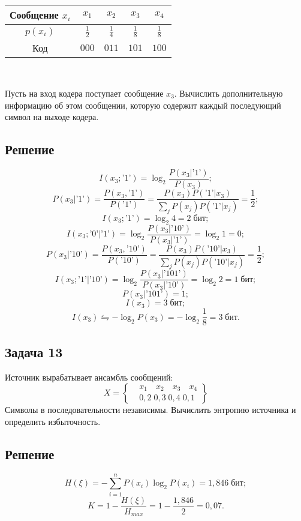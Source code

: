 \documentclass[oneside, final, 12pt]{extarticle}
\begin{document}
~

\begin{tabular}{|c|c|c|c|c|} \hline
	Сообщение \(x_i\) & \(x_1\) & \(x_2\) & \(x_3\) & \(x_4\) \\ \hline
	\(p(x_i)\) & \(\frac{1}{2}\) & \(\frac{1}{4}\) & \(\frac{1}{8}\) & \(\frac{1}{8}\) \\ \hline
	Код & \(000\) & \(011\) & \(101\) & \(100\) \\ \hline
\end{tabular}

~

Пусть на вход кодера поступает сообщение \(x_3\). Вычислить дополнительную информацию об этом сообщении, которую содержит каждый последующий символ на выходе кодера.

\subsection*{Решение}
\[I(x_3;\text{'}1\text{'})=\log_2\frac{P(x_3|\text{'}1\text{'})}{P(x_3)};\]
\[P(x_3|\text{'}1\text{'})=\frac{P(x_3,\text{'}1\text{'})}{P(\text{'}1\text{'})}=\frac{P(x_3)P(\text{'}1\text{'}|x_3)}{\sum_{j} P(x_j)P(\text{'}1\text{'}|x_j)}=\frac{1}{2};\]
\[I(x_3;\text{'}1\text{'})=\log_2 4=2\;\text{бит};\]
\[I(x_3;\text{'}0\text{'}|\text{'}1\text{'})=\log_2\frac{P(x_3|\text{'}10\text{'})}{P(x_3|\text{'}1\text{'})}=\log_2 1=0;\]
\[P(x_3|\text{'}10\text{'})=\frac{P(x_3,\text{'}10\text{'})}{P(\text{'}10\text{'})}=\frac{P(x_3)P(\text{'}10\text{'}|x_3)}{\sum_{j} P(x_j)P(\text{'}10\text{'}|x_j)}=\frac{1}{2};\]
\[I(x_3;\text{'}1\text{'}|\text{'}10\text{'})=\log_2\frac{P(x_3|\text{'}101\text{'})}{P(x_3|\text{'}10\text{'})}=\log_2 2=1\;\text{бит};\]
\[P(x_3|\text{'}101\text{'})=1;\]
\[I(x_3)=3\;\text{бит};\]
\[I(x_3)\leftrightharpoons -\log_2P(x_3)=-\log_2\frac{1}{8}=3\;\text{бит}.\]

\subsection{Задача 13}
Источник вырабатывает ансамбль сообщений:
\[X=\left\{\begin{aligned} & x_1 \quad x_2 \quad x_3 \quad x_4 \\ & 0,2 \; 0,3 \; 0,4 \; 0,1 \end{aligned}\right\}\]
Символы в последовательности независимы. Вычислить энтропию источника и определить избыточность.

\subsection*{Решение}
\[H(\xi)=-\sum_{i=1}^{n}P(x_i)\log_2P(x_i)=1,846\;\text{бит};\]
\[K=1-\frac{H(\xi)}{H_{max}}=1-\frac{1,846}{2}=0,07.\]
\end{document}
